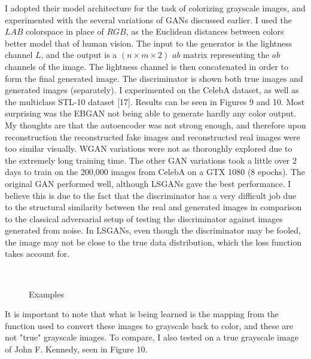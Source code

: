 \documentclass[9pt]{article}
\begin{document}
\noindent I adopted their model architecture for the task of colorizing grayscale images, and experimented with the several variations of GANs discussed earlier. I used the $LAB$ colorspace
in place of $RGB$, as the Euclidean distances between colors better model that of human vision. The input to the generator is the lightness channel $L$, and the output is a $(n \times m \times 2)$
$ab$ matrix representing the $ab$ channels of the image. The lightness channel is then concatenated in order to form the final generated image. The discriminator is shown both true images and
generated images (separately). I experimented on the CelebA dataset, as well as the multiclass STL-10 dataset [17]. Results can be seen in Figures 9 and 10. Most surprising was the EBGAN not being
able to generate hardly any color output. My thoughts are that the autoencoder was not strong enough, and therefore upon reconstruction the reconstructed fake images and reconstructed real images were
too similar visually. WGAN variations were not as thoroughly explored due to the extremely long training time. The other GAN variations took a little over 2 days to train on the 200,000 images from CelebA
on a GTX 1080 (8 epochs). The original GAN performed well, although LSGANs gave the best performance. I believe this is due to the fact that the discriminator has a very difficult job due to the structural similarity
between the real and generated images in comparison to the classical adversarial setup of testing the discriminator against images generated from noise. In LSGANs, even though the discriminator may be
fooled, the image may not be close to the true data distribution, which the loss function takes account for. \newline

\begin{figure}[!htb]
   \begin{center}$
      \begin{array}{cccc}

      \end{array}$
   \end{center}
   \caption{Examples}
\end{figure}

\noindent It is important to note that what is being learned is the mapping from the function used to convert these images to grayscale back to color, and these are not "true" grayscale images. To
compare, I also tested on a true grayscale image of John F. Kennedy, seen in Figure 10.
\end{document}
